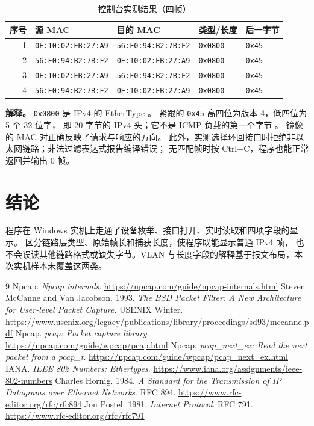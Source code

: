 \documentclass[acmsmall,nonacm]{acmart}
\begin{document}
\begin{table}[h]
\caption{控制台实测结果（四帧）}
\label{tab:observed}
\centering\small
\begin{tabular}{@{}rllll@{}}
\toprule
序号 & 源 MAC & 目的 MAC & 类型/长度 & 后一字节 \\
\midrule
1 & \texttt{0E:10:02:EB:27:A9} & \texttt{56:F0:94:B2:7B:F2} & \texttt{0x0800} & \texttt{0x45} \\
2 & \texttt{56:F0:94:B2:7B:F2} & \texttt{0E:10:02:EB:27:A9} & \texttt{0x0800} & \texttt{0x45} \\
3 & \texttt{0E:10:02:EB:27:A9} & \texttt{56:F0:94:B2:7B:F2} & \texttt{0x0800} & \texttt{0x45} \\
4 & \texttt{56:F0:94:B2:7B:F2} & \texttt{0E:10:02:EB:27:A9} & \texttt{0x0800} & \texttt{0x45} \\
\bottomrule
\end{tabular}
\end{table}

\textbf{解释。} \texttt{0x0800} 是 IPv4 的 EtherType \cite{rfc894}。
紧跟的 \texttt{0x45} 高四位为版本 4，低四位为 5 个 32 位字，
即 20 字节的 IPv4 头；它不是 ICMP 负载的第一个字节 \cite{rfc791}。
镜像的 MAC 对正确反映了请求与响应的方向。
此外，实测选择环回接口时拒绝非以太网链路；非法过滤表达式报告编译错误；
无匹配帧时按 Ctrl+C，程序也能正常返回并输出 0 帧。

\section{结论}

程序在 Windows 实机上走通了设备枚举、接口打开、实时读取和四项字段的显示。
区分链路层类型、原始帧长和捕获长度，使程序既能显示普通 IPv4 帧，
也不会误读其他链路格式或缺失字节。VLAN 与长度字段的解释基于报文布局，本次实机样本未覆盖这两类。

\begin{thebibliography}{9}
Npcap. \emph{Npcap internals}. \url{https://npcap.com/guide/npcap-internals.html}
Steven McCanne and Van Jacobson. 1993. \emph{The BSD Packet Filter: A New Architecture for
User-level Packet Capture}. USENIX Winter. \url{https://www.usenix.org/legacy/publications/library/proceedings/sd93/mccanne.pdf}
Npcap. \emph{pcap: Packet capture library}. \url{https://npcap.com/guide/wpcap/pcap.html}
Npcap. \emph{pcap\_next\_ex: Read the next packet from a pcap\_t}.
\url{https://npcap.com/guide/wpcap/pcap_next_ex.html}
IANA. \emph{IEEE 802 Numbers: Ethertypes}. \url{https://www.iana.org/assignments/ieee-802-numbers}
Charles Hornig. 1984. \emph{A Standard for the Transmission of IP Datagrams over Ethernet Networks}.
RFC 894. \url{https://www.rfc-editor.org/rfc/rfc894}
Jon Postel. 1981. \emph{Internet Protocol}. RFC 791. \url{https://www.rfc-editor.org/rfc/rfc791}
\end{thebibliography}
\end{document}
